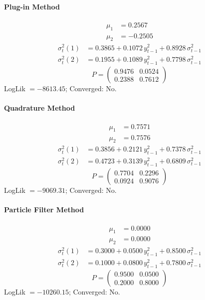 \documentclass[11pt, a4paper]{article}
\begin{document}
\paragraph{Plug-in Method}
\begin{align}
\mu_{1} &= 0.2567 \\
\mu_{2} &= -0.2505
\end{align}
\begin{align}
\sigma^2_{t}(1) &= 0.3865 + 0.1072\, y_{t-1}^2 + 0.8928\, \sigma^2_{t-1} \\
\sigma^2_{t}(2) &= 0.1955 + 0.1089\, y_{t-1}^2 + 0.7798\, \sigma^2_{t-1}
\end{align}
\begin{equation}
P = \begin{pmatrix} 0.9476 & 0.0524 \\ 0.2388 & 0.7612 \end{pmatrix}
\end{equation}
LogLik $= -8613.45$; Converged: No.

\paragraph{Quadrature Method}
\begin{align}
\mu_{1} &= 0.7571 \\
\mu_{2} &= 0.7576
\end{align}
\begin{align}
\sigma^2_{t}(1) &= 0.3856 + 0.2121\, y_{t-1}^2 + 0.7378\, \sigma^2_{t-1} \\
\sigma^2_{t}(2) &= 0.4723 + 0.3139\, y_{t-1}^2 + 0.6809\, \sigma^2_{t-1}
\end{align}
\begin{equation}
P = \begin{pmatrix} 0.7704 & 0.2296 \\ 0.0924 & 0.9076 \end{pmatrix}
\end{equation}
LogLik $= -9069.31$; Converged: No.

\paragraph{Particle Filter Method}
\begin{align}
\mu_{1} &= 0.0000 \\
\mu_{2} &= 0.0000
\end{align}
\begin{align}
\sigma^2_{t}(1) &= 0.3000 + 0.0500\, y_{t-1}^2 + 0.8500\, \sigma^2_{t-1} \\
\sigma^2_{t}(2) &= 0.1000 + 0.0800\, y_{t-1}^2 + 0.7800\, \sigma^2_{t-1}
\end{align}
\begin{equation}
P = \begin{pmatrix} 0.9500 & 0.0500 \\ 0.2000 & 0.8000 \end{pmatrix}
\end{equation}
LogLik $= -10260.15$; Converged: No.
\end{document}
